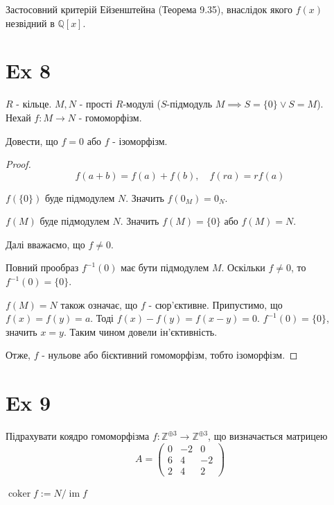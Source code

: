 \documentclass[11pt, a4paper]{article} %
\newcommand{\Z}{\mathbb{Z}}
\newcommand{\Q}{\mathbb{Q}}
\DeclareMathOperator{\coker}{coker}
\DeclareMathOperator{\im}{im}
\begin{document}
Застосовний критерій Ейзенштейна (Теорема 9.35), внаслідок якого $f(x)$ незвідний в $\Q[x]$.

\newpage
\section*{Ex 8}
\begin{mdframed}
    $R$ - кільце. $M,N$ - прості $R$-модулі ($S$-підмодуль $M \implies S=\{0\} \vee S=M$).\\
    Нехай $f : M \to N$ - гомоморфізм.

    Довести, що $f = 0$ або $f$ - ізоморфізм.
\end{mdframed}
\begin{proof}
    \[f(a+b) = f(a)+f(b), \quad f(ra)=rf(a)\]

    $f(\{0\})$ буде підмодулем $N$.
    Значить $f(0_M)=0_N$.

    $f(M)$ буде підмодулем $N$.
    Значить $f(M) = \{0\}$ або $f(M) = N$.

    Далі вважаємо, що $f \ne 0$.
    
    Повний прообраз $f^{-1}(0)$ має бути підмодулем $M$. 
    Оскільки $f\ne 0$, то $f^{-1}(0)=\{0\}$.

    $f(M)=N$ також означає, що $f$ - сюр'єктивне.
    Припустимо, що $f(x)=f(y)=a$.
    Тоді $f(x)-f(y) = f(x-y) = 0$.
    $f^{-1}(0) = \{0\}$, значить $x=y$. Таким чином довели ін'єктивність.

    Отже, $f$ - нульове або бієктивний гомоморфізм, тобто ізоморфізм.
\end{proof}

\section*{Ex 9}
\begin{mdframed}
    Підрахувати коядро гомоморфізма $f:\Z^{\oplus 3}\to\Z^{\oplus 3}$, що визначається матрицею
    \[A = \begin{pmatrix}
        0 & -2 & 0 \\
        6 & 4 & -2 \\
        2 & 4 & 2
    \end{pmatrix}\]
\end{mdframed}

$\coker f := N / \im f$
\end{document}
